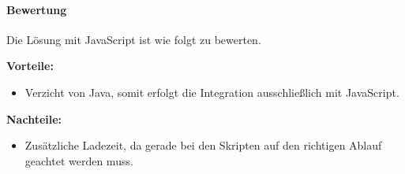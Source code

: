 \paragraph{Bewertung}

Die Lösung mit JavaScript ist wie folgt zu bewerten.

\begin{minipage}[t]{0.5\textwidth}
	\textbf{Vorteile:}
	\begin{itemize}
		\item Verzicht von Java, somit erfolgt die Integration ausschließlich mit JavaScript.
	\end{itemize}
\end{minipage}
\begin{minipage}[t]{0.5\textwidth}
	\textbf{Nachteile:}
	\begin{itemize}
		\item Zusätzliche Ladezeit, da gerade bei den Skripten auf den richtigen Ablauf geachtet werden muss.
	\end{itemize}
\end{minipage}